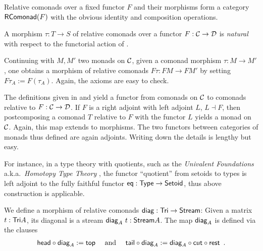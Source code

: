\documentclass[envcountsame]{llncs}
\begin{document}
Relative comonads over a fixed functor $F$ and their morphisms form a category $\mathsf{RComonad}(F)$ with the obvious identity and composition operations.

\begin{remark}
A morphism $\tau : T\to S$ of relative comonads over a functor $F:{\mathcal{C}}\to\mathcal{D}$ is  \emph{natural}
with respect to the functorial action of .
\end{remark}

\begin{Long}

\begin{example}\label{ex_relcom_from_com_morphism}
 Continuing  with $M, M'$ two monads on ${\mathcal{C}}$, given a comonad morphism $\tau : M \to M'$, one obtains a morphism of 
 relative comonads $F\tau : FM\to FM'$ by setting $F\tau_A := F(\tau_A)$.
 Again, the axioms are easy to check.
\end{example}


\begin{remark}
 The definitions given in  and  yield a functor from 
 comonads on ${\mathcal{C}}$ to comonads relative to $F:{\mathcal{C}}\to\mathcal{D}$. 
 If $F$ is a right adjoint with left adjoint $L$, $L\dashv F$, then postcomposing a comonad $T$ relative to $F$ with the functor $L$
 yields a monad on ${\mathcal{C}}$. Again, this map extends to morphisms.
 The two functors between categories of monads thus defined are again adjoints.
 Writing down the details is lengthy but easy.
 
 For instance, in a type theory with quotients, such as the \emph{Univalent Foundations} a.k.a.\ \emph{Homotopy Type Theory}
 \parencite{hottbook}, the functor \enquote{quotient} from setoids to types is left adjoint to the fully faithful 
 functor $\mathsf{eq}: \mathsf{Type}\to\mathsf{Setoid}$, thus above construction is applicable.
\end{remark}

\end{Long}


\begin{example}\label{ex_diag}
We define a morphism of relative comonads $\mathsf{diag} : \mathsf{Tri} \to \mathsf{Stream}$:
Given a matrix $t : \mathsf{Tri} A$, its diagonal is a stream $\mathsf{diag}_A~t : \mathsf{Stream} A$.
The map $\mathsf{diag}_A$ is defined via the clauses
\begin{align*} \comp{\diagonal_A}{\shead} := \head \quad\text{ and } \quad %
                  \comp{\diagonal_A}{\stail} := \comp{\comp{\tail}{\cut}}{\diagonal_A} \enspace . %
    \end{align*}
\end{example}
\end{document}

